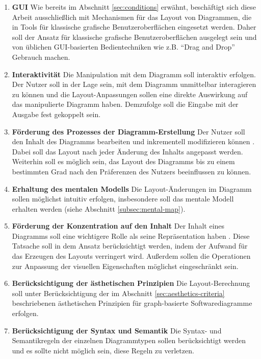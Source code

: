 \begin{enumerate}[label={K.\arabic*}]
    \item \label{req:gui} \textbf{GUI} Wie bereits im Abschnitt \ref{sec:conditions} erwähnt, beschäftigt sich diese Arbeit ausschließlich mit Mechanismen für das Layout von Diagrammen, die in Tools für klassische grafische Benutzeroberflächen eingesetzt werden. Daher soll der Ansatz für klassische grafische Benutzeroberflächen ausgelegt sein und von üblichen GUI-basierten Bedientechniken wie z.B. \enquote{Drag and Drop} Gebrauch machen.
    \item \label{req:interactivity} \textbf{Interaktivität} Die Manipulation mit dem Diagramm soll interaktiv erfolgen. Der Nutzer soll in der Lage sein, mit dem Diagramm unmittelbar interagieren zu können und die Layout-Anpassungen sollen eine direkte Auswirkung auf das manipulierte Diagramm haben. Demzufolge soll die Eingabe mit der Ausgabe fest gekoppelt sein.
    \item \label{req:editing-support} \textbf{Förderung des Prozesses der Diagramm-Erstellung} Der Nutzer soll den Inhalt des Diagramms bearbeiten und inkrementell modifizieren können \cite{GladischSchumann14Semi-Automatic}. Dabei soll das Layout nach jeder Änderung des Inhalts angepasst werden. Weiterhin soll es möglich sein, das Layout des Diagramms bis zu einem bestimmten Grad nach den Präferenzen des Nutzers beeinflussen zu können.
    \item \textbf{Erhaltung des mentalen Modells} Die Layout-Änderungen im Diagramm sollen möglichst intuitiv erfolgen, insbesondere soll das mentale Modell erhalten werden (siehe Abschnitt \ref{subsec:mental-map}).
    
    \item \label{req:focus-on-the-content} \textbf{Förderung der Konzentration auf den Inhalt} Der Inhalt eines Diagramms soll eine wichtigere Rolle als seine Repräsentation haben \cite[S.38ff]{Ambler02Agile}. Diese Tatsache soll in dem Ansatz berücksichtigt werden, indem der Aufwand für das Erzeugen des Layouts verringert wird. Außerdem sollen die Operationen zur Anpassung der visuellen Eigenschaften möglichst eingeschränkt sein.
    \item \label{req:aesthetics-criteria} \textbf{Berücksichtigung der ästhetischen Prinzipien} Die Layout-Berechnung soll unter Berücksichtigung der im Abschnitt \ref{sec:aesthetics-criteria} beschriebenen ästhetischen Prinzipien für graph-basierte Softwarediagramme erfolgen.
    \item \textbf{Berücksichtigung der Syntax und Semantik} Die Syntax- und Semantikregeln der einzelnen Diagrammtypen sollen berücksichtigt werden und es sollte nicht möglich sein, diese Regeln zu verletzen.    
\end{enumerate}
    
